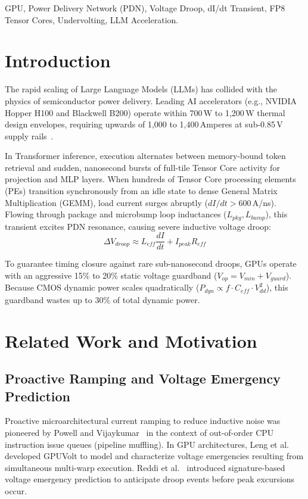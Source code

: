 \documentclass[conference]{IEEEtran}
\begin{document}
\begin{IEEEkeywords}
GPU, Power Delivery Network (PDN), Voltage Droop, dI/dt Transient, FP8 Tensor Cores, Undervolting, LLM Acceleration.
\end{IEEEkeywords}

\section{Introduction}
The rapid scaling of Large Language Models (LLMs) has collided with the physics of semiconductor power delivery. Leading AI accelerators (e.g., NVIDIA Hopper H100 and Blackwell B200) operate within 700\,W to 1,200\,W thermal design envelopes, requiring upwards of 1,000 to 1,400\,Amperes at sub-0.85\,V supply rails~\cite{gupta2023blackwell}. 

In Transformer inference, execution alternates between memory-bound token retrieval and sudden, nanosecond bursts of full-tile Tensor Core activity for projection and MLP layers. When hundreds of Tensor Core processing elements (PEs) transition synchronously from an idle state to dense General Matrix Multiplication (GEMM), load current surges abruptly ($dI/dt > 600$\,A/ns). Flowing through package and microbump loop inductances ($L_{pkg}, L_{bump}$), this transient excites PDN resonance, causing severe inductive voltage droop:
\begin{equation}
\Delta V_{droop} \approx L_{eff} \frac{dI}{dt} + I_{peak} R_{eff}
\end{equation}

To guarantee timing closure against rare sub-nanosecond droops, GPUs operate with an aggressive 15\% to 20\% static voltage guardband ($V_{op} = V_{min} + V_{guard}$). Because CMOS dynamic power scales quadratically ($P_{dyn} \propto f \cdot C_{eff} \cdot V_{dd}^2$), this guardband wastes up to 30\% of total dynamic power.

\section{Related Work and Motivation}

\subsection{Proactive Ramping and Voltage Emergency Prediction}
Proactive microarchitectural current ramping to reduce inductive noise was pioneered by Powell and Vijaykumar~\cite{powell2003pipeline} in the context of out-of-order CPU instruction issue queues (pipeline muffling). In GPU architectures, Leng et al.~\cite{leng2014gpuvolt} developed GPUVolt to model and characterize voltage emergencies resulting from simultaneous multi-warp execution. Reddi et al.~\cite{reddi2009voltage} introduced signature-based voltage emergency prediction to anticipate droop events before peak excursions occur.
\end{document}
